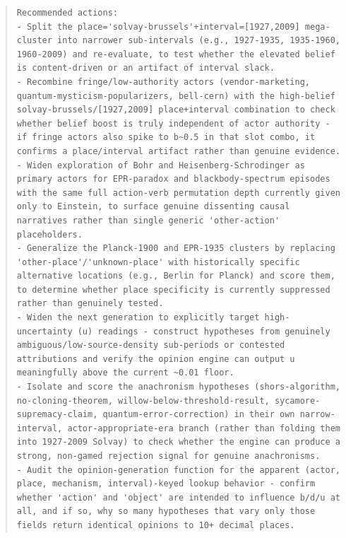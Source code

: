 \documentclass[11pt]{article}
\begin{document}
\begin{quote}
\begin{verbatim}
Recommended actions:
- Split the place='solvay-brussels'+interval=[1927,2009] mega-cluster into narrower sub-intervals (e.g., 1927-1935, 1935-1960, 1960-2009) and re-evaluate, to test whether the elevated belief is content-driven or an artifact of interval slack.
- Recombine fringe/low-authority actors (vendor-marketing, quantum-mysticism-popularizers, bell-cern) with the high-belief solvay-brussels/[1927,2009] place+interval combination to check whether belief boost is truly independent of actor authority - if fringe actors also spike to b~0.5 in that slot combo, it confirms a place/interval artifact rather than genuine evidence.
- Widen exploration of Bohr and Heisenberg-Schrodinger as primary actors for EPR-paradox and blackbody-spectrum episodes with the same full action-verb permutation depth currently given only to Einstein, to surface genuine dissenting causal narratives rather than single generic 'other-action' placeholders.
- Generalize the Planck-1900 and EPR-1935 clusters by replacing 'other-place'/'unknown-place' with historically specific alternative locations (e.g., Berlin for Planck) and score them, to determine whether place specificity is currently suppressed rather than genuinely tested.
- Widen the next generation to explicitly target high-uncertainty (u) readings - construct hypotheses from genuinely ambiguous/low-source-density sub-periods or contested attributions and verify the opinion engine can output u meaningfully above the current ~0.01 floor.
- Isolate and score the anachronism hypotheses (shors-algorithm, no-cloning-theorem, willow-below-threshold-result, sycamore-supremacy-claim, quantum-error-correction) in their own narrow-interval, actor-appropriate-era branch (rather than folding them into 1927-2009 Solvay) to check whether the engine can produce a strong, non-gamed rejection signal for genuine anachronisms.
- Audit the opinion-generation function for the apparent (actor, place, mechanism, interval)-keyed lookup behavior - confirm whether 'action' and 'object' are intended to influence b/d/u at all, and if so, why so many hypotheses that vary only those fields return identical opinions to 10+ decimal places.
\end{verbatim}
\end{quote}
\end{document}
